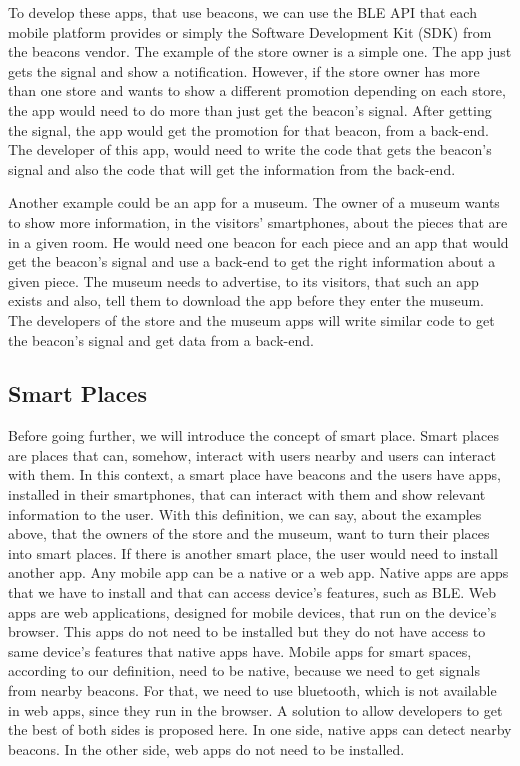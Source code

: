 To develop these apps, that use beacons, we can use the 
BLE API that each 
mobile platform provides or simply the Software
Development Kit (SDK) from the 
beacons vendor. The example of the store owner is a
simple one. The app just gets the signal and show a 
notification. However, if the store owner has more than
one store and wants to show a different promotion depending
on each store, the app would need to do more than just get
the beacon's signal. After getting the signal, the app
would get the promotion for that beacon, from a 
back-end. The developer of this app, would need to
write the code that gets the beacon's signal and also
the code that will get the information from the back-end.

Another example could be an app for a museum. The owner
of a museum wants to show more information, in the 
visitors' smartphones, about the pieces that are in a given
room. He would need one beacon for each piece and an app
that would get the beacon's signal and use a
back-end to get the right information about a given piece.
The museum needs to advertise, to its visitors, that such
an app exists and also, tell them to download the app
before they enter the museum. The developers of the
store and the museum apps will write similar code to get
the beacon's signal and get data from a back-end.

\subsection{Smart Places}
\label{sub:smart_places}
Before going further, we will introduce the concept of
smart place. Smart places are places that can, somehow,
interact with users nearby and users can interact 
with them.
In this context, a smart place have beacons and the users
have apps, installed in their smartphones, that can interact
with them and show relevant information to the user.
With this definition, we can say, about the examples above,
that the owners of the store and the museum, want to
turn their places into smart places.
If there is another smart place, the user would need to
install another app.
Any mobile app can be a native or a web app. Native apps
are apps that we have to install and that can access
device's features, such as BLE. Web apps are web
applications, designed for mobile devices, that run
on the device's browser. This apps do not need to be
installed but they do not have access
to same device's features that native apps have.
Mobile apps for smart spaces, according to our definition,
need to be native, because we need to get signals from
nearby beacons. For that, we need to use bluetooth, which is
not available in web apps, since they run in the browser.
A solution to allow developers to get the best of both sides
is proposed here. In one side,
native apps can detect nearby beacons. In the other side,
web apps do not need to be installed.

